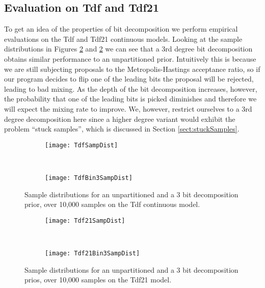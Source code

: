 \subsection{Evaluation on Tdf and Tdf21}

To get an idea of the properties of bit decomposition we perform empirical evaluations on the Tdf and Tdf21 continuous models. Looking at the sample distributions in Figures \ref{fig:tdf21PSampDist} and \ref{fig:tdf21PSampDist} we can see that a 3rd degree bit decomposition obtains similar performance to an unpartitioned prior. Intuitively this is because we are still subjecting proposals to the Metropolis-Hastings acceptance ratio, so if our program decides to flip one of the leading bits the proposal will be rejected, leading to bad mixing. As the depth of the bit decomposition increases, however, the probability that one of the leading bits is picked diminishes and therefore we will expect the mixing rate to improve.  We, however, restrict ourselves to a 3rd degree decomposition here since a higher degree variant would exhibit the problem ``stuck samples'', which is discussed in Section \ref{sect:stuckSamples}.

\begin{figure}[h]
    \centering
    \begin{subfigure}[t]{0.48\textwidth}
      \texttt{[image: TdfSampDist]}
    \end{subfigure}
    ~
    \begin{subfigure}[t]{0.48\textwidth}
      \texttt{[image: TdfBin3SampDist]}
    \end{subfigure}
    \caption{Sample distributions for an unpartitioned and a 3 bit decomposition prior, over 10,000 samples on the Tdf continuous model.}
    \label{fig:tdf21PSampDist}
\end{figure}

\begin{figure}[h]
    \centering
    \begin{subfigure}[t]{0.48\textwidth}
      \texttt{[image: Tdf21SampDist]}
    \end{subfigure}
    ~
    \begin{subfigure}[t]{0.48\textwidth}
      \texttt{[image: Tdf21Bin3SampDist]}
    \end{subfigure}
    \caption{Sample distributions for an unpartitioned and a 3 bit decomposition prios, over 10,000 samples on the Tdf21 model.}
    \label{fig:tdf21PSampDist}
\end{figure}

